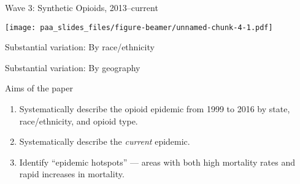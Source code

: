 \documentclass[ignorenonframetext,compress]{beamer}
\providecommand{\tightlist}{%
  \setlength{\itemsep}{0pt}\setlength{\parskip}{0pt}}
\begin{document}
\begin{frame}{Wave 3: Synthetic Opioids, 2013--current}

\texttt{[image: paa\_slides\_files/figure-beamer/unnamed-chunk-4-1.pdf]}

\end{frame}

\begin{frame}{Substantial variation: By race/ethnicity}

\end{frame}

\begin{frame}{Substantial variation: By geography}

\end{frame}

\begin{frame}{Aims of the paper}

\begin{enumerate}[<+->]
\def\labelenumi{\arabic{enumi}.}
\tightlist
\item
  Systematically describe the opioid epidemic from 1999 to 2016 by
  state, race/ethnicity, and opioid type.
\item
  Systematically describe the \emph{current} epidemic.
\item
  Identify ``epidemic hotspots'' --- areas with both high mortality
  rates and rapid increases in mortality.
\end{enumerate}

\end{frame}
\end{document}
